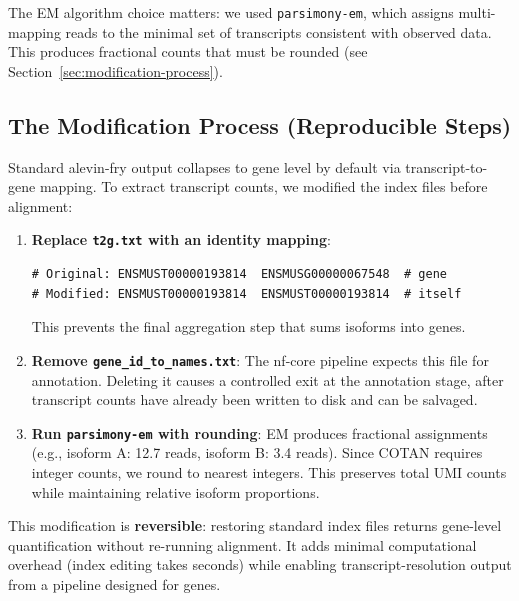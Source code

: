 The EM algorithm choice matters: we used \texttt{parsimony-em}, which assigns multi-mapping reads to the minimal set of transcripts consistent with observed data. This produces fractional counts that must be rounded (see Section~\ref{sec:modification-process}).

\subsection*{The Modification Process (Reproducible Steps)}\label{sec:modification-process}

Standard alevin-fry output collapses to gene level by default via transcript-to-gene mapping. To extract transcript counts, we modified the index files before alignment:

\begin{enumerate}
    \item \textbf{Replace \texttt{t2g.txt} with an identity mapping}:
{\small\begin{verbatim}
# Original: ENSMUST00000193814  ENSMUSG00000067548  # gene
# Modified: ENSMUST00000193814  ENSMUST00000193814  # itself
\end{verbatim}}
    This prevents the final aggregation step that sums isoforms into genes.
    
    \item \textbf{Remove \texttt{gene\_id\_to\_names.txt}}: The nf-core pipeline expects this file for annotation. Deleting it causes a controlled exit at the annotation stage, after transcript counts have already been written to disk and can be salvaged.
    
    \item \textbf{Run \texttt{parsimony-em} with rounding}: EM produces fractional assignments (e.g., isoform A: 12.7 reads, isoform B: 3.4 reads). Since COTAN requires integer counts, we round to nearest integers. This preserves total UMI counts while maintaining relative isoform proportions.
\end{enumerate}

This modification is \textbf{reversible}: restoring standard index files returns gene-level quantification without re-running alignment. It adds minimal computational overhead (index editing takes seconds) while enabling transcript-resolution output from a pipeline designed for genes.

